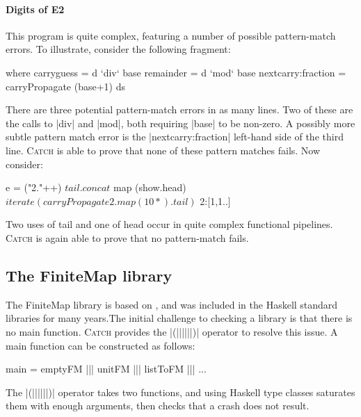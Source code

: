 \documentclass[preprint]{sigplanconf}
\newcommand{\C}[1]{\textsf{#1}}
\newcommand{\catch}{\textsc{Catch}}
\newenvironment{discuss}
    {\noindent\hspace{-1.5mm}\vline\hspace{1mm}\vline\hspace{1mm}\begin{minipage}[h]{\linewidth}}
    {\end{minipage}}
\begin{document}
\paragraph{Digits of E2}

This program is quite complex, featuring a number of possible pattern-match errors. To illustrate, consider the following fragment:

\begin{code}
  where  carryguess = d `div` base
         remainder = d `mod` base
         nextcarry:fraction = carryPropagate (base+1) ds
\end{code}

\noindent There are three potential pattern-match errors in as many lines. Two of these are the calls to |div| and |mod|, both requiring |base| to be non-zero. A possibly more subtle pattern match error is the |nextcarry:fraction| left-hand side of the third line. \catch{} is able to prove that none of these pattern matches fails. Now consider:

\begin{code}
e =  ("2."++) $
     tail . concat $
     map (show.head) $
     iterate (carryPropagate 2 . map (10*) . tail) $
     2:[1,1..]
\end{code}

\noindent Two uses of \C{tail} and one of \C{head} occur in quite complex functional pipelines. \catch{} is again able to prove that no pattern-match fails.

\subsection{The FiniteMap library}
\label{sec:filepath}

The FiniteMap library is based on \citep{adams:sets}, and was included in the Haskell standard libraries for many years.The initial challenge to checking a library is that there is no \C{main} function. \catch{} provides the |(||||||)| operator to resolve this issue. A \C{main} function can be constructed as follows:

\begin{code}
main = emptyFM ||| unitFM ||| listToFM ||| ...
\end{code}

\begin{discuss}
The |(||||||)| operator takes two functions, and using Haskell type classes saturates them with enough arguments, then checks that a crash does not result.
\end{discuss}
\end{document}
